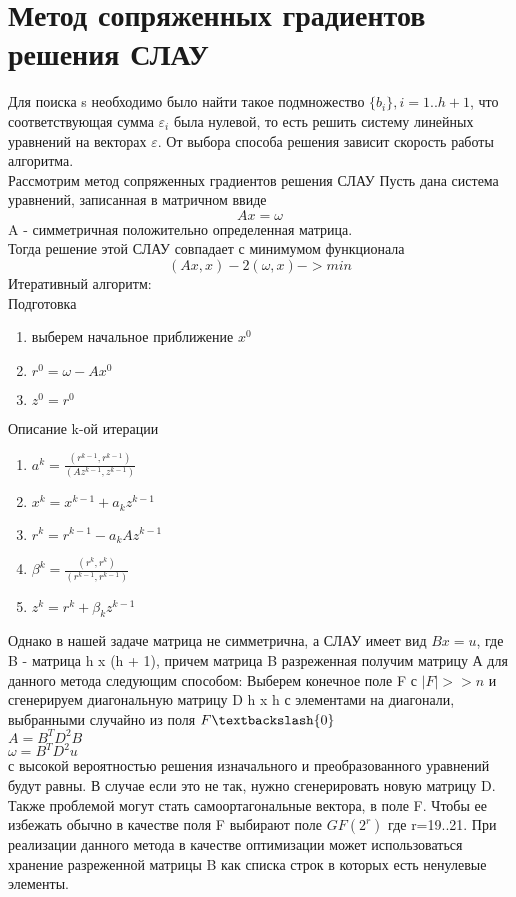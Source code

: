 \documentclass[14pt,a4paper,]{article}
\def\EPS{\varepsilon}         %
\begin{document}
\section{Метод сопряженных градиентов решения СЛАУ}
Для поиска s необходимо было найти такое подмножество $\{b_i\}, i = 1 .. h + 1$, что соответствующая сумма $\EPS_i$ была нулевой, то есть решить систему линейных уравнений на векторах $\EPS$. От выбора способа решения зависит скорость работы алгоритма. \\
Рассмотрим метод сопряженных градиентов решения СЛАУ
Пусть дана система уравнений, записанная в матричном ввиде
$$ Ax = \omega $$ 
A - симметричная положительно определенная матрица. \\
Тогда решение этой СЛАУ совпадает с минимумом функционала $$ (Ax, x) - 2(\omega, x) -> min $$
Итеративный алгоритм:\\
Подготовка
\begin{enumerate}
    \item выберем начальное приближение $x^0$
    \item $r^0 = \omega - Ax^0$
    \item $z^0 = r^0$
\end{enumerate}
Описание k-ой итерации
\begin{enumerate}
    \item $a^k = \frac{(r^{k-1}, r^{k-1})}{(Az^{k-1}, z^{k-1})} $
    \item $ x^k = x^{k-1} + a_k z^{k-1}$
    \item $ r^k = r^{k-1} - a_k A z^{k-1}$ 
    \item $ \beta ^ k = \frac{(r^k, r^k)}{(r^{k-1}, r^{k-1})}$
    \item $ z^k = r^k + \beta_k z^{k-1}$
\end{enumerate}
Однако в нашей задаче матрица не симметрична, а СЛАУ имеет вид $Bx = u$, где B - матрица  h x (h + 1), причем матрица B разреженная 
получим матрицу А для данного метода следующим способом:
Выберем конечное поле F с $ |F| >> n $ и сгенерируем диагональную матрицу D h x h с элементами на диагонали, выбранными случайно из поля $F\textbackslash\{0\}$  \\
$ A = B^T D^2 B$\\
$ \omega = B^T D^2 u $\\
с высокой вероятностью решения изначального и преобразованного уравнений будут равны. В случае если это не так, нужно сгенерировать новую матрицу D. Также проблемой могут стать самоортагональные вектора, в поле F. Чтобы ее избежать обычно в качестве поля F выбирают поле $GF(2^r)$ где r=19..21.
При реализации данного метода в качестве оптимизации может использоваться хранение разреженной матрицы B как списка строк в которых есть ненулевые элементы.
\end{document}
